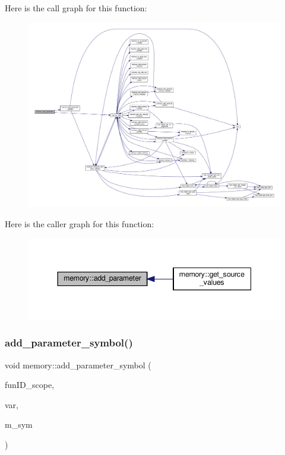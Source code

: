 Here is the call graph for this function\+:
\nopagebreak
\begin{figure}[H]
\begin{center}
\leavevmode
\includegraphics[width=350pt]{d8/d99/classmemory_a6857ec6eab958a0a108f12c6e28d994b_cgraph}
\end{center}
\end{figure}
Here is the caller graph for this function\+:
\nopagebreak
\begin{figure}[H]
\begin{center}
\leavevmode
\includegraphics[width=344pt]{d8/d99/classmemory_a6857ec6eab958a0a108f12c6e28d994b_icgraph}
\end{center}
\end{figure}
\mbox{\label{classmemory_ae85e2b58d571e54800c0effee384a2b2}} 
\subsubsection{\texorpdfstring{add\+\_\+parameter\+\_\+symbol()}{add\_parameter\_symbol()}}
{\footnotesize\ttfamily void memory\+::add\+\_\+parameter\+\_\+symbol (\begin{DoxyParamCaption}\item[{unsigned int}]{fun\+I\+D\+\_\+scope,  }\item[{unsigned int}]{var,  }\item[{const \hyperlink{memory__symbol_8hpp_af3608dbc27177447c2d777fa712cc82a}{memory\+\_\+symbol\+Ref}}]{m\+\_\+sym }\end{DoxyParamCaption})}



